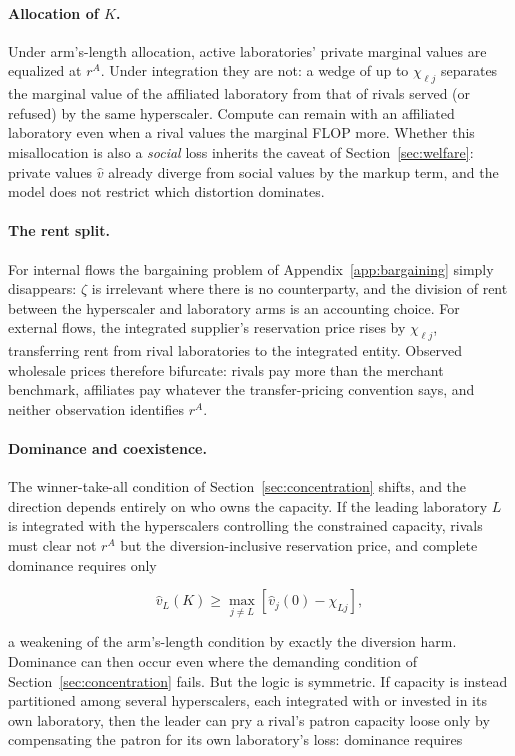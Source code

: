 \documentclass[11pt]{article}
\begin{document}
\paragraph{Allocation of $K$.} Under arm's-length allocation, active laboratories' private marginal values are equalized at $r^A$. Under integration they are not: a wedge of up to $\chi_{\ell j}$ separates the marginal value of the affiliated laboratory from that of rivals served (or refused) by the same hyperscaler. Compute can remain with an affiliated laboratory even when a rival values the marginal FLOP more. Whether this misallocation is also a \emph{social} loss inherits the caveat of Section~\ref{sec:welfare}: private values $\widehat v$ already diverge from social values by the markup term, and the model does not restrict which distortion dominates.

\paragraph{The rent split.} For internal flows the bargaining problem of Appendix~\ref{app:bargaining} simply disappears: $\zeta$ is irrelevant where there is no counterparty, and the division of rent between the hyperscaler and laboratory arms is an accounting choice. For external flows, the integrated supplier's reservation price rises by $\chi_{\ell j}$, transferring rent from rival laboratories to the integrated entity. Observed wholesale prices therefore bifurcate: rivals pay more than the merchant benchmark, affiliates pay whatever the transfer-pricing convention says, and neither observation identifies $r^A$.

\paragraph{Dominance and coexistence.} The winner-take-all condition of Section~\ref{sec:concentration} shifts, and the direction depends entirely on who owns the capacity. If the leading laboratory $L$ is integrated with the hyperscalers controlling the constrained capacity, rivals must clear not $r^A$ but the diversion-inclusive reservation price, and complete dominance requires only

\begin{equation}\widehat v_L(K)\geq\max_{j\neq L}\left[\widehat v_j(0)-\chi_{Lj}\right],\end{equation}

a weakening of the arm's-length condition by exactly the diversion harm. Dominance can then occur even where the demanding condition of Section~\ref{sec:concentration} fails. But the logic is symmetric. If capacity is instead partitioned among several hyperscalers, each integrated with or invested in its own laboratory, then the leader can pry a rival's patron capacity loose only by compensating the patron for its own laboratory's loss: dominance requires
\end{document}
